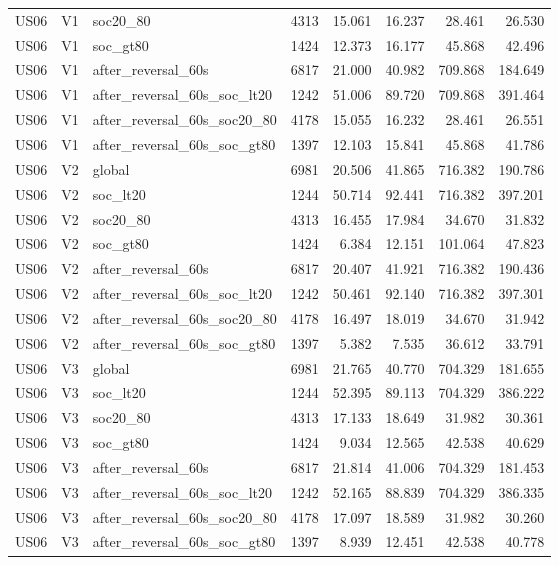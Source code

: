 \begin{tabular}{lllrrrrr}
US06 & V1 & soc20\_80 & 4313 & 15.061 & 16.237 & 28.461 & 26.530 \\
US06 & V1 & soc\_gt80 & 1424 & 12.373 & 16.177 & 45.868 & 42.496 \\
US06 & V1 & after\_reversal\_60s & 6817 & 21.000 & 40.982 & 709.868 & 184.649 \\
US06 & V1 & after\_reversal\_60s\_soc\_lt20 & 1242 & 51.006 & 89.720 & 709.868 & 391.464 \\
US06 & V1 & after\_reversal\_60s\_soc20\_80 & 4178 & 15.055 & 16.232 & 28.461 & 26.551 \\
US06 & V1 & after\_reversal\_60s\_soc\_gt80 & 1397 & 12.103 & 15.841 & 45.868 & 41.786 \\
US06 & V2 & global & 6981 & 20.506 & 41.865 & 716.382 & 190.786 \\
US06 & V2 & soc\_lt20 & 1244 & 50.714 & 92.441 & 716.382 & 397.201 \\
US06 & V2 & soc20\_80 & 4313 & 16.455 & 17.984 & 34.670 & 31.832 \\
US06 & V2 & soc\_gt80 & 1424 & 6.384 & 12.151 & 101.064 & 47.823 \\
US06 & V2 & after\_reversal\_60s & 6817 & 20.407 & 41.921 & 716.382 & 190.436 \\
US06 & V2 & after\_reversal\_60s\_soc\_lt20 & 1242 & 50.461 & 92.140 & 716.382 & 397.301 \\
US06 & V2 & after\_reversal\_60s\_soc20\_80 & 4178 & 16.497 & 18.019 & 34.670 & 31.942 \\
US06 & V2 & after\_reversal\_60s\_soc\_gt80 & 1397 & 5.382 & 7.535 & 36.612 & 33.791 \\
US06 & V3 & global & 6981 & 21.765 & 40.770 & 704.329 & 181.655 \\
US06 & V3 & soc\_lt20 & 1244 & 52.395 & 89.113 & 704.329 & 386.222 \\
US06 & V3 & soc20\_80 & 4313 & 17.133 & 18.649 & 31.982 & 30.361 \\
US06 & V3 & soc\_gt80 & 1424 & 9.034 & 12.565 & 42.538 & 40.629 \\
US06 & V3 & after\_reversal\_60s & 6817 & 21.814 & 41.006 & 704.329 & 181.453 \\
US06 & V3 & after\_reversal\_60s\_soc\_lt20 & 1242 & 52.165 & 88.839 & 704.329 & 386.335 \\
US06 & V3 & after\_reversal\_60s\_soc20\_80 & 4178 & 17.097 & 18.589 & 31.982 & 30.260 \\
US06 & V3 & after\_reversal\_60s\_soc\_gt80 & 1397 & 8.939 & 12.451 & 42.538 & 40.778 \\

\end{tabular}
